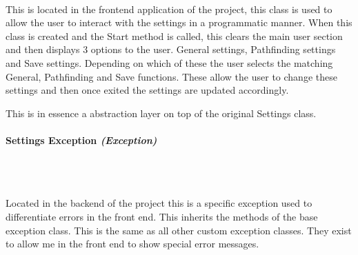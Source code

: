 \begin{FlushLeft}
    \begin{figure}[H]
        \centering
    \end{figure}\\
    This is located in the frontend application of the project, this class is used to allow the user to interact with the settings in a programmatic manner. When this class is created and the Start method is called, this clears the main user section and then displays 3 options to the user. General settings, Pathfinding settings and Save settings. Depending on which of these the user selects the matching General, Pathfinding and Save functions. These allow the user to change these settings and then once exited the settings are updated accordingly. \\ \bk

    This is in essence a abstraction layer on top of the original Settings class. \\
    \bk

    \pagebreak
\paragraph{Settings Exception \textit{(Exception)}} \mbox{} \\

    \begin{figure}[H]
        \centering
    \end{figure}\\
    Located in the backend of the project this is a specific exception used to differentiate errors in the front end. This inherits the methods of the base exception class. This is the same as all other custom exception classes. They exist to allow me in the front end to show special error messages.
    \bk


\end{FlushLeft}
